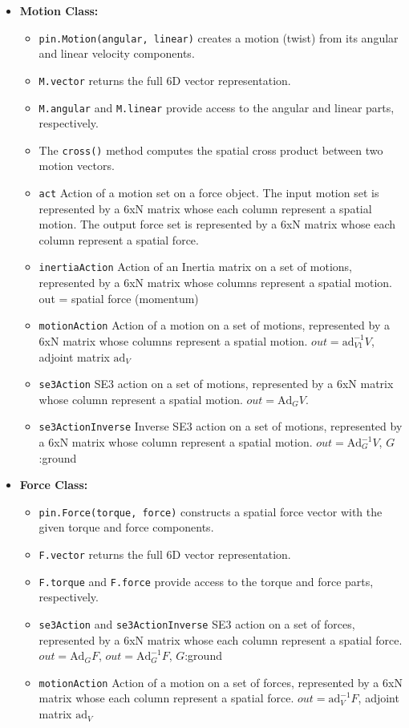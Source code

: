\documentclass[10pt]{article}
\begin{document}
\begin{itemize}
    \item \textbf{Motion Class:}
    \begin{itemize}
        \item \texttt{pin.Motion(angular, linear)} creates a motion (twist) from its angular and linear velocity components.
        \item \texttt{M.vector} returns the full 6D vector representation.
        \item \texttt{M.angular} and \texttt{M.linear} provide access to the angular and linear parts, respectively.
        \item The \texttt{cross()} method computes the spatial cross product between two motion vectors.
        \item \texttt{act} Action of a motion set on a force object. The input motion set is represented by a 6xN matrix whose each column represent a spatial motion. The output force set is represented by a 6xN matrix whose each column represent a spatial force.
        \item \texttt{inertiaAction} 	Action of an Inertia matrix on a set of motions, represented by a 6xN matrix whose columns represent a spatial motion. out = spatial force (momentum)
        \item \texttt{motionAction}  Action of a motion on a set of motions, represented by a 6xN matrix whose columns represent a spatial motion. $out = \text{ad}_{V1}^{-1} V$, adjoint matrix $\text{ad}_V$
        \item \texttt{se3Action}	SE3 action on a set of motions, represented by a 6xN matrix whose column represent a spatial motion. $out = \text{Ad}_G V$.
        \item \texttt{se3ActionInverse} 	Inverse SE3 action on a set of motions, represented by a 6xN matrix whose column represent a spatial motion. $out = \text{Ad}_G^{-1} V$, $G$:ground

        
    \end{itemize}
    
    \item \textbf{Force Class:}
    \begin{itemize}
        \item \texttt{pin.Force(torque, force)} constructs a spatial force vector with the given torque and force components.
        \item \texttt{F.vector} returns the full 6D vector representation.
        \item \texttt{F.torque} and \texttt{F.force} provide access to the torque and force parts, respectively.
        \item \texttt{se3Action} and \texttt{se3ActionInverse} SE3 action on a set of forces, represented by a 6xN matrix whose each column represent a spatial force. $out = \text{Ad}_G F$, $out = \text{Ad}_G^{-1} F$, $G$:ground
        \item \texttt{motionAction} Action of a motion on a set of forces, represented by a 6xN matrix whose each column represent a spatial force. $out = \text{ad}_V^{-1} F$, adjoint matrix $\text{ad}_V$
    \end{itemize}


\end{itemize}
\end{document}
